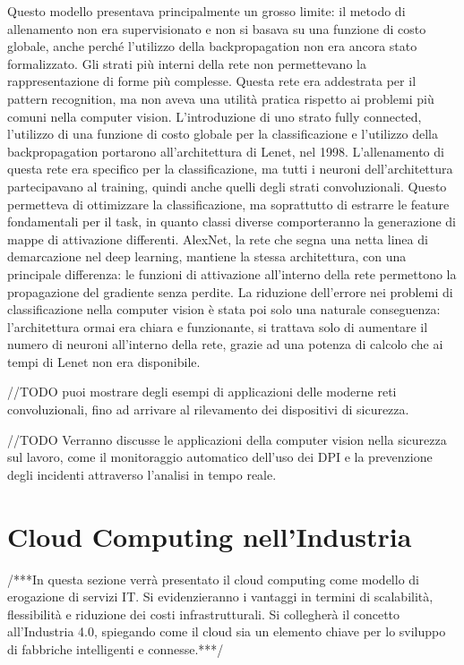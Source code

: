 Questo modello presentava principalmente un grosso limite: il metodo di allenamento non era supervisionato e non si basava su una funzione di costo globale, anche perché l'utilizzo della backpropagation non era ancora stato formalizzato. Gli strati più interni della rete non permettevano la rappresentazione di forme più complesse. Questa rete era addestrata per il pattern recognition, ma non aveva una utilità pratica rispetto ai problemi più comuni nella computer vision. L'introduzione di uno strato fully connected, l'utilizzo di una funzione di costo globale per la classificazione e l'utilizzo della backpropagation portarono all'architettura di Lenet, nel 1998. L'allenamento di questa rete era specifico per la classificazione, ma tutti i neuroni dell'architettura partecipavano al training, quindi anche quelli degli strati convoluzionali. Questo permetteva di ottimizzare la classificazione, ma soprattutto di estrarre le feature fondamentali per il task, in quanto classi diverse comporteranno la generazione di mappe di attivazione differenti. AlexNet, la rete che segna una netta linea di demarcazione nel deep learning, mantiene la stessa architettura, con una principale differenza: le funzioni di attivazione all'interno della rete permettono la propagazione del gradiente senza perdite. La riduzione dell'errore nei problemi di classificazione nella computer vision è stata poi solo una naturale conseguenza: l'architettura ormai era chiara e funzionante, si trattava solo di aumentare il numero di neuroni all'interno della rete, grazie ad una potenza di calcolo che ai tempi di Lenet non era disponibile.  
   
//TODO puoi mostrare degli esempi di applicazioni delle moderne reti convoluzionali, fino ad arrivare al rilevamento dei dispositivi di sicurezza.

//TODO Verranno discusse le applicazioni della computer vision nella sicurezza sul lavoro, come il monitoraggio automatico dell'uso dei DPI e la prevenzione degli incidenti attraverso l'analisi in tempo reale.

\section{Cloud Computing nell'Industria}

/***In questa sezione verrà presentato il cloud computing come modello di erogazione di servizi IT. Si evidenzieranno i vantaggi in termini di scalabilità, flessibilità e riduzione dei costi infrastrutturali. Si collegherà il concetto all'Industria 4.0, spiegando come il cloud sia un elemento chiave per lo sviluppo di fabbriche intelligenti e connesse.***/

